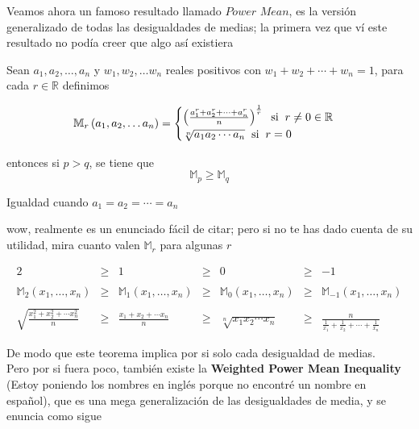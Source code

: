 \documentclass[11pt]{scrartcl}
\begin{document}
Veamos ahora un famoso resultado llamado $\textit{Power Mean}$, es la versión generalizado de todas las desigualdades de medias; la primera vez que ví este resultado no podía creer que algo así existiera


\begin{theorem}
\label{Power Mean Inequality}
Sean $a_1,a_2,\ldots,a_n$ y $w_1,w_2,\ldots w_n$ reales positivos con $w_1+w_2+\cdots+w_n=1$, para cada $r\in \mathbb{R}$ definimos 

\[\mathbb{M}_r
        \left(a_1,a_2,\dots a_n\right)=\begin{cases}\left(\frac{a_1^r+a_2^r+\cdots+ a_n^r}{n}\right)^\frac{1}{r} \hspace{0.2cm} \text{si} \hspace{0.2cm}r\neq 0\in\mathbb{R} \\ \sqrt[n]{a_1a_2\cdots a_n} \hspace{0.2cm} \text{si}\hspace{0.2cm} r=0 \end{cases}\]

        entonces si $p>q$, se tiene que
    \[ \mathbb{M}_p\geq \mathbb{M}_q\]

     Igualdad cuando $a_1=a_2=\cdots=a_n$


\end{theorem}


wow, realmente es un enunciado fácil de citar; pero si no te has dado cuenta de su utilidad, mira cuanto valen $\mathbb{M}_r$ para algunas $r$



\[ \begin{array}{ccccccc} 2& \geq&  1& \geq&  0 &\geq&  -1 \\ \\\mathbb{M}_2\left(x_1,\dots ,x_n\right) & \geq & \mathbb{M}_1\left(x_1,\dots ,x_n\right)&\geq  &\mathbb{M}_0\left(x_1,\dots ,x_n\right)&\geq &\mathbb{M}_{-1}\left(x_1,\dots ,x_n\right) \\ \\  \sqrt{\frac{x_1^2+x_2^2+\cdots x_n^2}{n}} &\geq & \frac{x_1+x_2+\cdots x_n}{n} & \geq &\sqrt[n]{x_1x_2\cdots x_n} &\geq & \frac{n}{\frac{1}{x_1}+\frac{1}{x_2}+\cdots+\frac{1}{x_n}} \end{array} \]

De modo que este teorema implica por si solo cada desigualdad de medias.\\

Pero por si fuera poco, también existe la \textbf{Weighted Power Mean Inequality} ({\small Estoy poniendo los nombres en inglés porque no encontré un nombre en español}), que es una mega generalización de las desigualdades de media, y se enuncia como sigue
\end{document}
